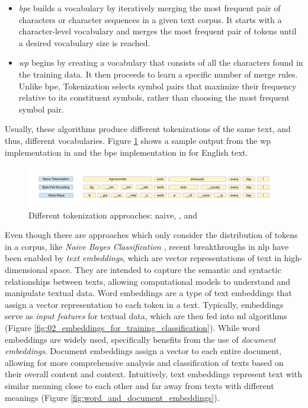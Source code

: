 \begin{itemize}
    \item \emph{\gls{bpe}}  builds a vocabulary by iteratively merging the most frequent pair of characters or character sequences in a given text corpus. It starts with a character-level vocabulary and merges the most frequent pair of tokens until a desired vocabulary size is reached.
    \item \emph{\gls{wp}}  begins by creating a vocabulary that consists of all the characters found in the training data. It then proceeds to learn a specific number of merge rules. Unlike \gls{bpe}, \wordpiece{} Tokenization selects symbol pairs that maximize their frequency relative to its constituent symbols, rather than choosing the most frequent symbol pair.
\end{itemize}

Usually, these algorithms produce different tokenizations of the same text, and thus, different vocabularies. Figure \ref{fig:02_tokenizer_comparison} shows a sample output from the \gls{wp} implementation in  and the \gls{bpe} implementation in  for English text.

\begin{figure}
    \centering
    \includegraphics[width=\textwidth]{Figures/02/02_Tokenizer_comparison.png}
    \caption{Different tokenization approaches: naive, \bpe{}, and \wordpiece{}}
    \label{fig:02_tokenizer_comparison}
\end{figure}

Even though there are \textclassification{} approaches which only consider the distribution of tokens in a corpus, like \emph{Naive Bayes Classification} , recent breakthroughs in \gls{nlp} have been enabled by \emph{text embeddings}, which are vector representations of text in high-dimensional space. They are intended to capture the semantic and syntactic relationships between texts, allowing computational models to understand and manipulate textual data. Word embeddings are a type of text embeddings that assign a vector representation to each token in a text. 
Typically, embeddings serve as \emph{input features} for textual data, which are then fed into \gls{ml} algorithms (Figure \ref{fig:02_embeddings_for_training_classification}).
While word embeddings are widely used, \textclassification{} specifically benefits from the use of \emph{document embeddings}. Document embeddings assign a vector to each entire document, allowing for more comprehensive analysis and classification of texts based on their overall content and context. Intuitively, text embeddings represent text with similar meaning close to each other and far away from texts with different meanings (Figure \ref{fig:word_and_document_embeddings}).

